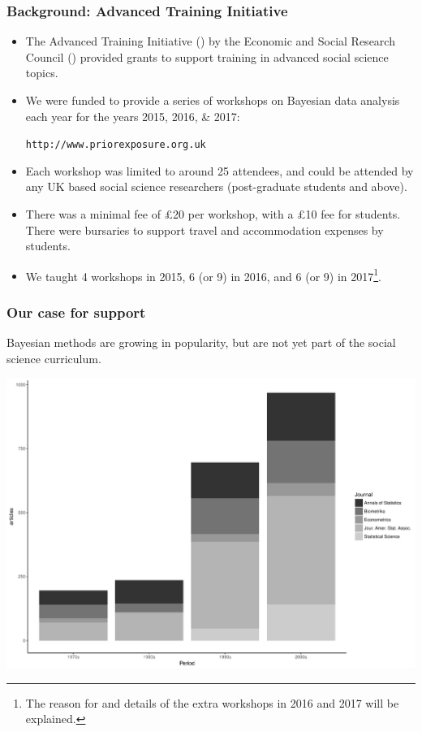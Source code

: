 \begin{frame}
	\frametitle{Background: Advanced Training Initiative}

	\begin{itemize}

		\item The Advanced Training Initiative (\ati) by the Economic
			and Social Research Council (\esrc) provided grants to
			support training in advanced social science topics.

		\item We were funded to provide a series of workshops on Bayesian data analysis each year for the years 2015, 2016, \& 2017:\\
			{\begin{center}\texttt{http://www.priorexposure.org.uk}\end{center}}

		\item Each workshop was limited to around 25 attendees, and could be attended by any UK based social science researchers (post-graduate students and above).

		\item There was a minimal fee of \pounds20 per workshop, with a \pounds10 fee for students. There were bursaries to support travel and accommodation expenses by students.

		\item We taught 4 workshops in 2015, 6 (or 9) in 2016, and 6 (or 9) in 2017\footnote{The reason for and details of the extra workshops in 2016 and 2017 will be explained.}.

	\end{itemize}

\end{frame}

\begin{frame}
	\frametitle{Our case for support}
		Bayesian methods are growing in popularity, but are not yet part of the social science curriculum.

		\includegraphics[width=\textwidth]{articles.pdf}
\end{frame}


